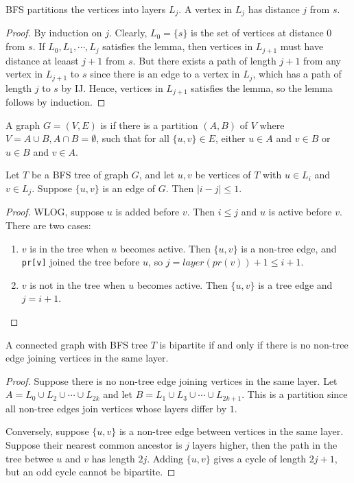 \documentclass[12pt]{scrartcl}
\begin{document}
\begin{lemma}
  BFS partitions the vertices into layers $L_j$. A vertex in $L_j$ has distance $j$ from $s$. 
  \begin{proof}
    By induction on $j$. Clearly, $L_0 = \{s\}$ is the set of vertices at distance $0$ from $s$.
    If $L_0, L_1, \cdots, L_j$ satisfies the lemma, then vertices in $L_{j+1}$ must have distance at leaast $j+1$ from $s$. 
    But there exists a path of length $j+1$ from any vertex in $L_{j+1}$ to $s$ since there is an edge to a vertex in $L_j$, which has a path of length 
    $j$ to $s$ by IJ. Hence, vertices in $L_{j+1}$ satisfies the lemma, so the lemma follows by induction. 
  \end{proof}
\end{lemma}

\begin{definition}
  A graph $G = (V, E)$ is  if there is a partition $(A, B)$ of $V$ where
  $V = A \cup B, A \cap B = \emptyset$, such that for all $\{u, v\} \in E$, either $u \in A$ and $v \in B$ 
  or $u \in B$ and $v \in A$. 
\end{definition}

\begin{lemma}
  Let $T$ be a BFS tree of graph $G$, and let $u, v$ be vertices of $T$ with $u \in L_i$ and 
  $v \in L_j$. Suppose $\{u, v\}$ is an edge of $G$. Then $|i - j| \leq 1$. 
  \begin{proof}
    WLOG, suppose $u$ is added before $v$. Then $i \leq j$ and $u$ is active before $v$. There are two cases: 
    \begin{enumerate}
      \item $v$ is in the tree when $u$ becomes active. Then $\{u, v\}$ is a non-tree edge, and 
      \verb|pr[v]| joined the tree before $u$, so $j = layer(pr(v)) + 1 \leq i + 1$. 
      \item $v$ is not in the tree when $u$ becomes active. Then $\{u, v\}$ is a tree edge and $j = i + 1$. 
    \end{enumerate}
  \end{proof}
\end{lemma}

\begin{theorem}
  A connected graph with BFS tree $T$ is bipartite if and only if there is no non-tree edge joining vertices in the same layer. 
  \begin{proof}
    Suppose there is no non-tree edge joining vertices in the same layer. 
    Let $A = L_0 \cup L_2 \cup \cdots \cup L_{2k}$ and let $B = L_1 \cup L_3 \cup \cdots \cup L_{2k+1}$. 
    This is a partition since all non-tree edges join vertices whose layers differ by $1$. 

    Conversely, suppose $\{u, v\}$ is a non-tree edge between vertices in the same layer. Suppose their nearest common ancestor 
    is $j$ layers higher, then the path in the tree betwee $u$ and $v$ has length $2j$. Adding $\{u, v\}$ 
    gives a cycle of length $2j + 1$, but an odd cycle cannot be bipartite. 
  \end{proof}
\end{theorem}
\end{document}
